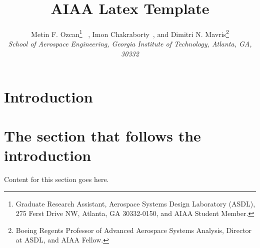 \documentclass[]{aiaa-tc}%
\title{AIAA Latex Template}
\author{
 Metin F. Ozcan\thanks{Graduate Research Assistant, Aerospace Systems Design Laboratory (ASDL), 275 Ferst Drive NW, Atlanta, GA 30332-0150, and AIAA Student Member.}
 \ , Imon Chakraborty\footnotemark[1]
 \ , and Dimitri N. Mavris\thanks{Boeing Regents Professor of Advanced Aerospace Systems Analysis, Director at ASDL, and AIAA Fellow.}  \\
 {\normalsize\itshape
  School of Aerospace Engineering, Georgia Institute of Technology, Atlanta, GA, 30332}
}
\begin{document}

\maketitle

\begin{abstract}



\end{abstract}

\printnomenclature %

\section{Introduction}



\section{The section that follows the introduction}
Content for this section goes here.
\end{document}
